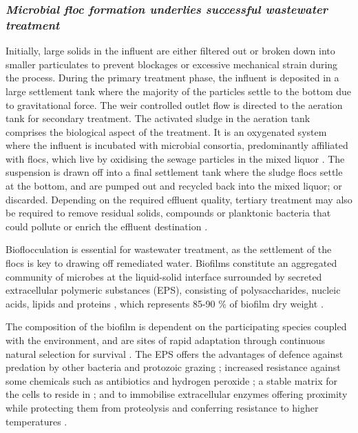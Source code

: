 \documentclass[11pt]{article}
\begin{document}
\subsubsection{\emph{Microbial floc formation underlies successful wastewater treatment}}
Initially, large solids in the influent are either filtered out or broken down into smaller particulates to prevent blockages or excessive mechanical strain during the process. During the primary treatment phase, the influent is deposited in a large settlement tank where the majority of the particles settle to the bottom due to gravitational force. The weir controlled outlet flow is directed to the aeration tank for secondary treatment. The activated sludge in the aeration tank comprises the biological aspect of the treatment. It is an oxygenated system where the influent is incubated with microbial consortia, predominantly affiliated with flocs, which live by oxidising the sewage particles in the mixed liquor \cite{mayhew1997low}. The suspension is drawn off into a final settlement tank where the sludge flocs settle at the bottom, and are pumped out and recycled back into the mixed liquor; or discarded. Depending on the required effluent quality, tertiary treatment may also be required to remove residual solids, compounds or planktonic bacteria that could pollute or enrich the effluent destination \cite{Price_95}.

Bioflocculation is essential for wastewater treatment, as the settlement of the flocs is key to drawing off remediated water. Biofilms constitute an aggregated community of microbes at the liquid-solid interface surrounded by secreted extracellular polymeric substances (EPS), consisting of polysaccharides, nucleic acids, lipids and proteins \cite{wingender1999}, which represents 85-90 \% of biofilm dry weight \cite{Frolund_96}. 


The composition of the biofilm is dependent on the participating species coupled with the environment, and are sites of rapid adaptation through continuous natural selection for survival \cite{boles2008,matz2005,palmer2001}.  
The EPS offers the advantages of defence against predation by other bacteria \cite{rao2005} and protozoic grazing \cite{matz2005}; increased resistance against some chemicals such as antibiotics and hydrogen peroxide \cite{burmolle_06}; a stable matrix for the cells to reside in \cite{Flemming_10}; and to immobilise extracellular enzymes offering proximity while protecting them from proteolysis and conferring resistance to higher temperatures \cite{wingender2002extracellular,Flemming_10,skillman1998}.
\end{document}
